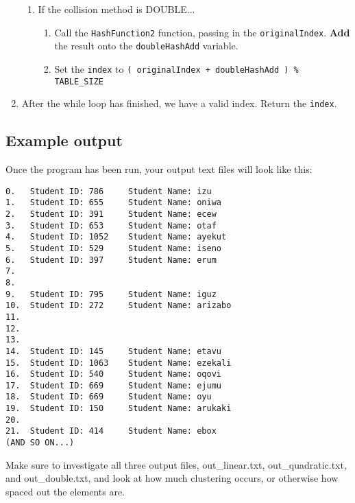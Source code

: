 \documentclass[a4paper,12pt,oneside]{book}
\begin{document}
\begin{enumerate}
\begin{enumerate}
        
        \item   If the collision method is DOUBLE...
            \begin{enumerate}
                \item   Call the \texttt{HashFunction2} function, passing in
                    the \texttt{originalIndex}. \textbf{Add} the result
                    onto the \texttt{doubleHashAdd} variable.
                \item   Set the \texttt{index} to
                    \texttt{( originalIndex + doubleHashAdd ) \% TABLE\_SIZE}
            \end{enumerate}
            
    \end{enumerate}

    \item   After the while loop has finished, we have a valid index. Return the \texttt{index}.
    
\end{enumerate}

\hrulefill

\subsection{Example output}

Once the program has been run, your output text files will look like this:

\begin{lstlisting}[style=textfile]
0.   Student ID: 786 	 Student Name: izu
1.   Student ID: 655 	 Student Name: oniwa
2.   Student ID: 391 	 Student Name: ecew
3.   Student ID: 653 	 Student Name: otaf
4.   Student ID: 1052 	 Student Name: ayekut
5.   Student ID: 529 	 Student Name: iseno
6.   Student ID: 397 	 Student Name: erum
7.   
8.   
9.   Student ID: 795 	 Student Name: iguz
10.  Student ID: 272 	 Student Name: arizabo
11.  
12.  
13.  
14.  Student ID: 145 	 Student Name: etavu
15.  Student ID: 1063 	 Student Name: ezekali
16.  Student ID: 540 	 Student Name: oqovi
17.  Student ID: 669 	 Student Name: ejumu
18.  Student ID: 669 	 Student Name: oyu
19.  Student ID: 150 	 Student Name: arukaki
20.  
21.  Student ID: 414 	 Student Name: ebox
(AND SO ON...)
\end{lstlisting}

Make sure to investigate all three output files, out\_linear.txt,
out\_quadratic.txt, and out\_double.txt, and look at how much
clustering occurs, or otherwise how spaced out the elements are.
\end{document}
